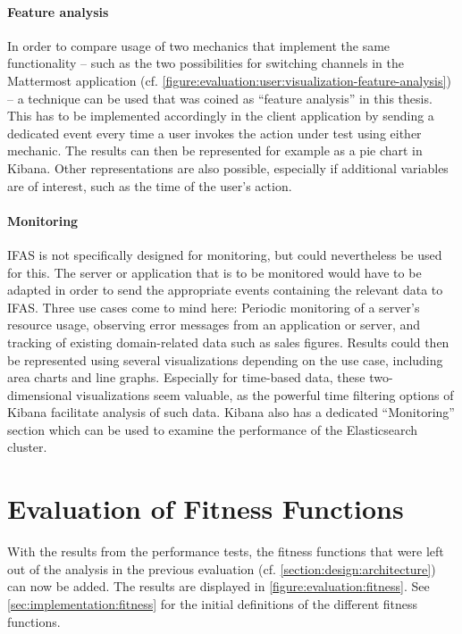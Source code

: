 \paragraph{Feature analysis}
In order to compare usage of two mechanics that implement the same functionality -- such as the two possibilities for switching channels in the Mattermost application (cf. \cref{figure:evaluation:user:visualization-feature-analysis}) -- a technique can be used that was coined as ``feature analysis'' in this thesis.
This has to be implemented accordingly in the client application by sending a dedicated event every time a user invokes the action under test using either mechanic.
The results can then be represented for example as a pie chart in Kibana.
Other representations are also possible, especially if additional variables are of interest, such as the time of the user's action.

\paragraph{Monitoring}
\ac{IFAS} is not specifically designed for monitoring, but could nevertheless be used for this.
The server or application that is to be monitored would have to be adapted in order to send the appropriate events containing the relevant data to \ac{IFAS}.
Three use cases come to mind here: Periodic monitoring of a server's resource usage, observing error messages from an application or server, and tracking of existing domain-related data such as sales figures.
Results could then be represented using several visualizations depending on the use case, including area charts and line graphs.
Especially for time-based data, these two-dimensional visualizations seem valuable, as the powerful time filtering options of Kibana facilitate analysis of such data.
Kibana also has a dedicated ``Monitoring'' section which can be used to examine the performance of the Elasticsearch cluster.

\section{Evaluation of Fitness Functions}
\label{sec:evaluation:fitness}

With the results from the performance tests, the fitness functions that were left out of the analysis in the previous evaluation (cf. \cref{section:design:architecture}) can now be added.
The results are displayed in \cref{figure:evaluation:fitness}.
See \cref{sec:implementation:fitness} for the initial definitions of the different fitness functions.

